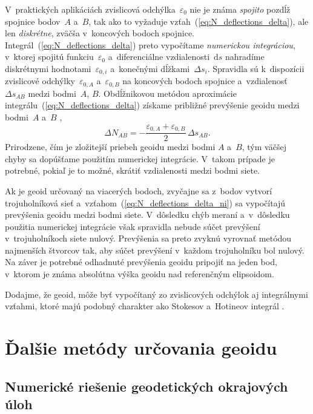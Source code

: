 \documentclass[a4paper, 12pt]{book}
\newcommand{\diff}{\mathrm d}
\begin{document}
V~praktických aplikáciách zvislicová odchýlka~$\varepsilon_0$ nie je známa 
\emph{spojito} pozdĺž spojnice bodov~$A$ a~$B$, tak ako to vyžaduje 
vzťah~(\ref{eq:N_deflections_delta}), ale len \emph{diskrétne}, zväčša 
v~koncových bodoch spojnice.  Integrál~(\ref{eq:N_deflections_delta}) preto 
vypočítame \emph{numerickou integráciou}, v~ktorej spojitú 
funkciu~$\varepsilon_0$ a~diferenciálne vzdialenosti~$\diff s$ nahradíme 
diskrétnymi hodnotami~$\varepsilon_{0,i}$ a~konečnými dĺžkami~$\Delta s_i$.  
Spravidla sú k~dispozícii zvislicové odchýlky~$\varepsilon_{0,A}$ 
a~$\varepsilon_{0,B}$ na koncových bodoch spojnice a~vzdialenosť~$\Delta 
s_{AB}$ medzi bodmi~$A$, $B$.  Obdĺžnikovou metódou aproximácie 
integrálu~(\ref{eq:N_deflections_delta}) získame približné prevýšenie geoidu 
medzi bodmi~$A$ a~$B$ \parencite[pre popis obdĺžnikovej metódy pozri 
napríklad][]{Macak2021},
%
\begin{equation}
\label{eq:N_deflections_delta_ni}
\Delta N_{AB} = -\frac{\varepsilon_{0,A} + \varepsilon_{0,B}}{2} \, \Delta 
s_{AB}{.}
\end{equation}
%
Prirodzene, čím je zložitejší priebeh geoidu medzi bodmi $A$ a~$B$, tým väčšej 
chyby sa dopúšťame použitím numerickej integrácie.  V~takom prípade je 
potrebné, pokiaľ je to možné, skrátiť vzdialenosti medzi bodmi siete.

Ak je geoid určovaný na viacerých bodoch, zvyčajne sa z~bodov vytvorí 
trojuholníková sieť a~vzťahom~(\ref{eq:N_deflections_delta_ni}) sa vypočítajú 
prevýšenia geoidu medzi bodmi siete.  V~dôsledku chýb meraní a~v~dôsledku 
použitia numerickej integrácie však spravidla nebude súčet prevýšení 
v~trojuholníkoch siete nulový.  Prevýšenia sa preto zvyknú vyrovnať metódou 
najmenších štvorcov tak, aby súčet prevýšení v~každom trojuholníku bol nulový.  
Na záver je potrebné odhadnuté prevýšenia geoidu pripojiť na jeden bod, 
v~ktorom je známa absolútna výška geoidu nad referenčným elipsoidom.

Dodajme, že geoid, môže byť vypočítaný zo zvislicových odchýlok aj integrálnymi 
vzťahmi, ktoré majú podobný charakter ako Stokesov a~Hotineov integrál 
\parencite[pozri napríklad][]{Sjoberg2017}.


\section{Ďalšie metódy určovania geoidu}
\label{sec:other_geoid_determination_methods}

\subsection{Numerické riešenie geodetických okrajových úloh}
\end{document}
